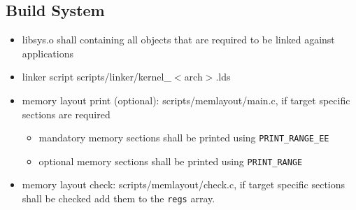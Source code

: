 	\subsection{Build System}
		\begin{itemize}
			\item libsys.o shall containing all objects that are required to be linked against applications
			\item linker script scripts/linker/kernel\_$<$arch$>$.lds
			\item memory layout print (optional): scripts/memlayout/main.c, if target specific sections are required
				\begin{itemize}
					\item mandatory memory sections shall be printed using \lstinline{PRINT_RANGE_EE}
					\item optional memory sections shall be printed using \lstinline{PRINT_RANGE}
				\end{itemize}

			\item memory layout check: scripts/memlayout/check.c, if target specific sections shall be checked add them to the \lstinline{regs} array.
		\end{itemize}

\vfill
\pagebreak

